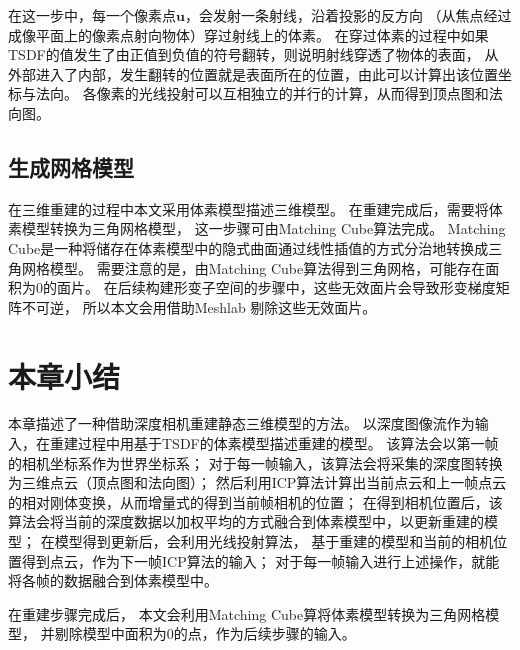 在这一步中，每一个像素点$\mathbf{u}$，会发射一条射线，沿着投影的反方向
（从焦点经过成像平面上的像素点射向物体）穿过射线上的体素。
在穿过体素的过程中如果TSDF的值发生了由正值到负值的符号翻转，则说明射线穿透了物体的表面，
从外部进入了内部，发生翻转的位置就是表面所在的位置，由此可以计算出该位置坐标与法向。
各像素的光线投射可以互相独立的并行的计算，从而得到顶点图和法向图。

\subsection{生成网格模型}
在三维重建的过程中本文采用体素模型描述三维模型。
在重建完成后，需要将体素模型转换为三角网格模型，
这一步骤可由Matching Cube算法\cite{lorensen1987marching}完成。 
Matching Cube是一种将储存在体素模型中的隐式曲面通过线性插值的方式分治地转换成三角网格模型。
需要注意的是，由Matching Cube算法\cite{lorensen1987marching}得到三角网格，可能存在面积为0的面片。
在后续构建形变子空间的步骤中，这些无效面片会导致形变梯度矩阵不可逆，
所以本文会用借助Meshlab\cite{LocalChapterEvents:ItalChap:ItalianChapConf2008:129-136}
剔除这些无效面片。

\section{本章小结}
本章描述了一种借助深度相机重建静态三维模型的方法。
以深度图像流作为输入，在重建过程中用基于TSDF的体素模型描述重建的模型。
该算法会以第一帧的相机坐标系作为世界坐标系；
对于每一帧输入，该算法会将采集的深度图转换为三维点云（顶点图和法向图）；
然后利用ICP算法计算出当前点云和上一帧点云的相对刚体变换，从而增量式的得到当前帧相机的位置；
在得到相机位置后，该算法会将当前的深度数据以加权平均的方式融合到体素模型中，以更新重建的模型；
在模型得到更新后，会利用光线投射算法，
基于重建的模型和当前的相机位置得到点云，作为下一帧ICP算法的输入；
对于每一帧输入进行上述操作，就能将各帧的数据融合到体素模型中。

在重建步骤完成后，
本文会利用Matching Cube算\cite{lorensen1987marching}将体素模型转换为三角网格模型，
并剔除模型中面积为0的点，作为后续步骤的输入。




